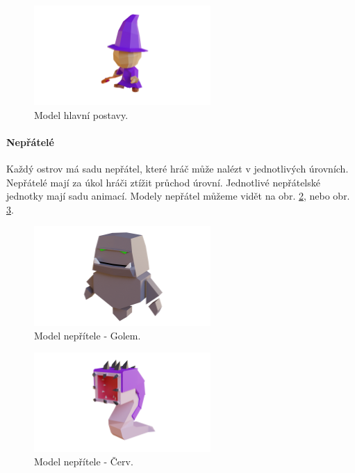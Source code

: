 \begin{figure}[h]
    \centering
    \includegraphics[width=0.6\textwidth]{img/hlavni-postava.png}
    \caption{Model hlavní postavy.}
    \label{fig:hlavni-postava}
\end{figure}

\paragraph{Nepřátelé}
Každý ostrov má sadu nepřátel, které hráč může nalézt v jednotlivých úrovních. Nepřátelé mají za úkol hráči ztížit průchod úrovní. Jednotlivé nepřátelské jednotky mají sadu animací. Modely nepřátel můžeme vidět na obr. \ref{fig:nepritel-golem}, nebo obr. \ref{fig:nepritel-cerv}.

\begin{figure}[h]
    \centering
    \includegraphics[width=0.6\textwidth]{img/nepritel-golem.png}
    \caption{Model nepřítele - Golem.}
    \label{fig:nepritel-golem}
\end{figure}

\begin{figure}[h]
    \centering
    \includegraphics[width=0.6\textwidth]{img/nepritel-cerv.png}
    \caption{Model nepřítele - Červ.}
    \label{fig:nepritel-cerv}
\end{figure}

